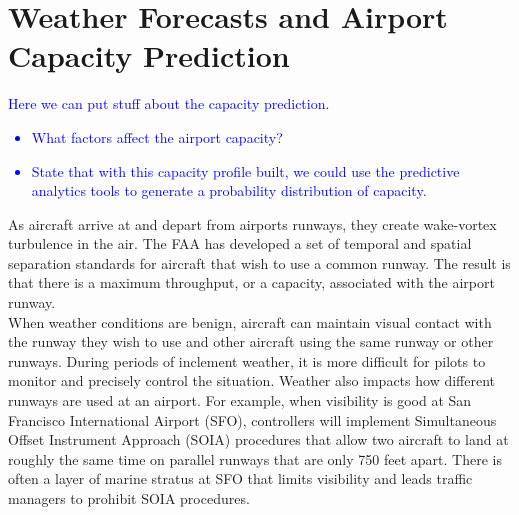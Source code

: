 \documentclass[12pt]{article}
\begin{document}
\section{Weather Forecasts and Airport Capacity Prediction}\label{Capacity}
	\textcolor{blue}{Here we can put stuff about the capacity prediction.
	\begin{itemize}
		\item What factors affect the airport capacity?
		\item State that with this capacity profile built, we could use the predictive analytics tools to generate a probability distribution of capacity.
	\end{itemize}
	}
	As aircraft arrive at and depart from airports runways, they create wake-vortex turbulence in the air.  The FAA has developed a set of temporal and spatial separation standards for aircraft that wish to use a common runway.  The result is that there is a maximum throughput, or a capacity, associated with the airport runway.\\
	\newline
	When weather conditions are benign, aircraft can maintain visual contact with the runway they wish to use and other aircraft using the same runway or other runways.  During periods of inclement weather, it is more difficult for pilots to monitor and precisely control the situation.  Weather also impacts how different runways are used at an airport.  For example, when visibility is good at San Francisco International Airport (SFO), controllers will implement Simultaneous Offset Instrument Approach (SOIA) procedures that allow two aircraft to land at roughly the same time on parallel runways that are only 750 feet apart.  There is often a layer of marine stratus at SFO that limits visibility and leads traffic managers to prohibit SOIA procedures.
\end{document}
